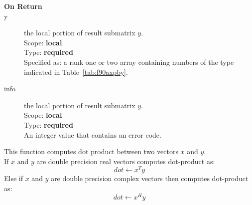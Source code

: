 \begin{description}

\end{description}

\begin{description}
\item[\bf On Return]
\item[y] the local portion of result submatrix $y$.\\
Scope: {\bf local} \\
Type: {\bf required} \\
Specified as: a rank one or two array containing numbers of the type
indicated in Table~\ref{tab:f90axpby}.
\item[info] the local portion of result submatrix $y$.\\
Scope: {\bf local} \\
Type: {\bf required} \\
An integer value that contains an error code. 
\end{description}


%
%


This function computes dot product between two vectors $x$ and
$y$.\\
If $x$ and $y$ are double precision real vectors
computes dot-product as:
\[dot \leftarrow x^T y\]
Else if $x$ and $y$ are double precision complex vectors then computes dot-product as:
\[dot \leftarrow x^H y\]

